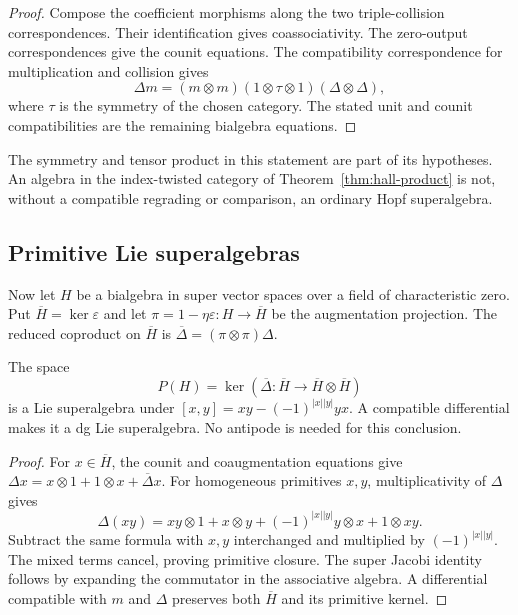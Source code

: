 \begin{proof}
Compose the coefficient morphisms along the two triple-collision
correspondences. Their identification gives coassociativity.
The zero-output correspondences give the counit equations. The
compatibility correspondence for multiplication and collision gives
\[
 \Delta m=(m\otimes m)(1\otimes\tau\otimes1)(\Delta\otimes\Delta),
\]
where $\tau$ is the symmetry of the chosen category. The stated unit
and counit compatibilities are the remaining bialgebra equations.
\end{proof}

The symmetry and tensor product in this statement are part of its
hypotheses. An algebra in the index-twisted category of
Theorem~\ref{thm:hall-product} is not, without a compatible
regrading or comparison, an ordinary Hopf superalgebra.

\subsection{Primitive Lie superalgebras}
\label{app:hall-primitives}

Now let $H$ be a bialgebra in super vector spaces over a field of
characteristic zero. Put $\overline H=\ker\varepsilon$ and let
$\pi=1-\eta\varepsilon:H\to\overline H$ be the augmentation
projection. The reduced coproduct on $\overline H$ is
$\overline\Delta=(\pi\otimes\pi)\Delta$.

\begin{theorem}
\label{thm:hall-primitives-formal}
The space
\[
 P(H)=\ker(\overline\Delta:\overline H
                          \longrightarrow\overline H\otimes\overline H)
\]
is a Lie superalgebra under
$[x,y]=xy-(-1)^{|x||y|}yx$. A compatible differential makes it a dg
Lie superalgebra. No antipode is needed for this conclusion.
\end{theorem}

\begin{proof}
For $x\in\overline H$, the counit and coaugmentation equations give
$\Delta x=x\otimes1+1\otimes x+\overline\Delta x$.
For homogeneous primitives $x,y$, multiplicativity of $\Delta$ gives
\[
 \Delta(xy)=xy\otimes1+x\otimes y
       +(-1)^{|x||y|}y\otimes x+1\otimes xy.
\]
Subtract the same formula with $x,y$ interchanged and multiplied by
$(-1)^{|x||y|}$. The mixed terms cancel, proving primitive closure.
The super Jacobi identity follows by expanding the commutator in the
associative algebra. A differential compatible with $m$ and $\Delta$
preserves both $\overline H$ and its primitive kernel.
\end{proof}

